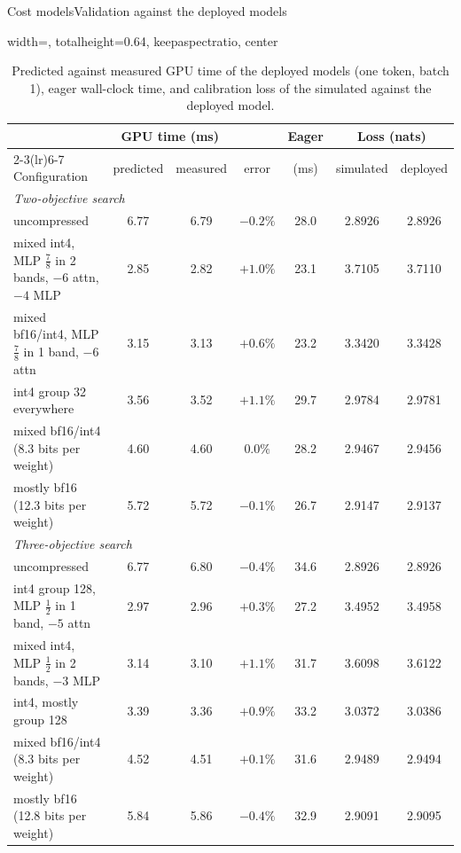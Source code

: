 \documentclass[aspectratio=169,10pt]{beamer}
\begin{document}
\begin{frame}{Cost models}{Validation against the deployed models}
\begin{table}
\centering
\begin{adjustbox}{width=\linewidth, totalheight=0.64\textheight, keepaspectratio, center}
\centering
\footnotesize
\setlength{\tabcolsep}{4pt}
\begin{tabular}{lcccccc}
\toprule
& \multicolumn{2}{c}{GPU time (ms)} & & Eager & \multicolumn{2}{c}{Loss (nats)} \\
\cmidrule(lr){2-3}\cmidrule(lr){6-7}
Configuration & predicted & measured & error & (ms) & simulated & deployed \\
\midrule
\multicolumn{7}{l}{\textit{Two-objective search}} \\
  uncompressed                                         & 6.77 & 6.79 & $-0.2\%$ & 28.0 & 2.8926 & 2.8926 \\
  mixed int4, MLP $\tfrac78$ in 2 bands, $-6$ attn, $-4$ MLP & 2.85 & 2.82 & $+1.0\%$ & 23.1 & 3.7105 & 3.7110 \\
  mixed bf16/int4, MLP $\tfrac78$ in 1 band, $-6$ attn  & 3.15 & 3.13 & $+0.6\%$ & 23.2 & 3.3420 & 3.3428 \\
  int4 group 32 everywhere                              & 3.56 & 3.52 & $+1.1\%$ & 29.7 & 2.9784 & 2.9781 \\
  mixed bf16/int4 (8.3 bits per weight)                 & 4.60 & 4.60 & $0.0\%$  & 28.2 & 2.9467 & 2.9456 \\
  mostly bf16 (12.3 bits per weight)                    & 5.72 & 5.72 & $-0.1\%$ & 26.7 & 2.9147 & 2.9137 \\
\midrule
\multicolumn{7}{l}{\textit{Three-objective search}} \\
  uncompressed                                         & 6.77 & 6.80 & $-0.4\%$ & 34.6 & 2.8926 & 2.8926 \\
  int4 group 128, MLP $\tfrac12$ in 1 band, $-5$ attn   & 2.97 & 2.96 & $+0.3\%$ & 27.2 & 3.4952 & 3.4958 \\
  mixed int4, MLP $\tfrac12$ in 2 bands, $-3$ MLP       & 3.14 & 3.10 & $+1.1\%$ & 31.7 & 3.6098 & 3.6122 \\
  int4, mostly group 128                               & 3.39 & 3.36 & $+0.9\%$ & 33.2 & 3.0372 & 3.0386 \\
  mixed bf16/int4 (8.3 bits per weight)                 & 4.52 & 4.51 & $+0.1\%$ & 31.6 & 2.9489 & 2.9494 \\
  mostly bf16 (12.8 bits per weight)                    & 5.84 & 5.86 & $-0.4\%$ & 32.9 & 2.9091 & 2.9095 \\
\bottomrule
\end{tabular}
\end{adjustbox}
\caption{Predicted against measured GPU time of the deployed models (one token, batch 1), eager
wall-clock time, and calibration loss of the simulated against the deployed model.}\label{tab:validation}
\end{table}
\end{frame}
\end{document}
